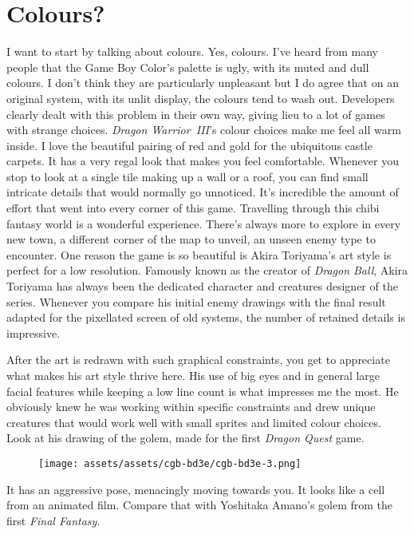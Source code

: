 \documentclass{book}
\begin{document}
\FloatBarrier\needspace{10mm}\section*{Colours?}\nopagebreak[4]

I want to start by talking about colours. Yes, colours. I’ve heard from many people that the Game Boy Color’s palette is ugly, with its muted and dull colours. I don’t think they are particularly unpleasant but I do agree that on an original system, with its unlit display, the colours tend to wash out. Developers clearly dealt with this problem in their own way, giving lieu to a lot of games with strange choices. \emph{Dragon Warrior III}’s colour choices make me feel all warm inside. I love the beautiful pairing of red and gold for the ubiquitous castle carpets. It has a very regal look that makes you feel comfortable. Whenever you stop to look at a single tile making up a wall or a roof, you can find small intricate details that would normally go unnoticed. It’s incredible the amount of effort that went into every corner of this game. Travelling through this chibi fantasy world is a wonderful experience. There’s always more to explore in every new town, a different corner of the map to unveil, an unseen enemy type to encounter. One reason the game is so beautiful is Akira Toriyama’s art style is perfect for a low resolution. Famously known as the creator of \emph{Dragon Ball}, Akira Toriyama has always been the dedicated character and creatures designer of the series. Whenever you compare his initial enemy drawings with the final result adapted for the pixellated screen of old systems, the number of retained details is impressive.

After the art is redrawn with such graphical constraints, you get to appreciate what makes his art style thrive here. His use of big eyes and in general large facial features while keeping a low line count is what impresses me the most. He obviously knew he was working within specific constraints and drew unique creatures that would work well with small sprites and limited colour choices. Look at his drawing of the golem, made for the first \emph{Dragon Quest} game.

\begin{figure}[hbt]
\vskip 10pt
\centering \texttt{[image: assets/assets/cgb-bd3e/cgb-bd3e-3.png]}
\vskip 6pt
\end{figure}

It has an aggressive pose, menacingly moving towards you. It looks like a cell from an animated film. Compare that with Yoshitaka Amano’s golem from the first \emph{Final Fantasy}.
\end{document}
